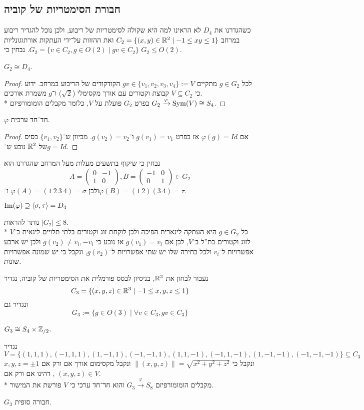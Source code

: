 \subsection{חבורת הסימטריות של קוביה}
כשהגדרנו את $D_4$ לא הראינו למה היא שקולה לסימטריות של ריבוע, ולכן נוכל להגדיר ריבוע במרחב $C_2 = \{ (x, y) \in \mathbb{R}^2 \mid -1 \le xy \le 1 \}$
ואת ההזזות על־ידי העתקות אורתוגונליות $G_2 = \{ v \in C_2, g \in O(2) \mid gv \in C_2 \}$.
נבחין כי $G_2 \le O(2)$.
\begin{proposition}
	$G_2 \cong D_4$.
\end{proposition}
\begin{proof}
	לכל $g \in G_2$ מתקיים $gv \in \{v_1, v_2, v_3, v_4\} := V$ הקודקודים של הריבוע במרחב.
	ידוע כי $V \subseteq C_2$ קבוצת וקטורים עם אורך מקסימלי ($\sqrt{2}$) ו־$g$ משמרת אורכים. \\*
	בפרט $G_2$ פועלת על $V$, כלומר מקבלים הומומורפיזם $G_2 \xrightarrow{\varphi} \operatorname{Sym}(V) \cong S_4$.
\end{proof}
\begin{lemma}
	$\varphi$ חד־חד ערכית.
\end{lemma}
\begin{proof}
	אם $\varphi(g) = Id$ אז בפרט $g(v_1) = v_1$ ו־$g(v_2) = v_2$. מכיוון ש־$\{v_1, v_2\}$ בסיס של $\mathbb{R}^2$ נובע ש־$g = Id$.
\end{proof}
נבחין כי שיקוף בתשעים מעלות מעל המרחב שהגדרנו הוא
\[
	A = \begin{pmatrix}
		0 & -1 \\
		1 & 0
	\end{pmatrix},
	B = \begin{pmatrix}
		-1 & 0 \\
		0 & 1
	\end{pmatrix}
	\in G_2
\]
ולכן $\varphi(A) = (1\ 2\ 3\ 4) = \sigma$ ו־$\varphi(B) = (1\ 2)(3\ 4) = \tau$.
\begin{conclusion}
	$\operatorname{Im}(\varphi) \supseteq \langle \sigma, \tau \rangle = D_4$
\end{conclusion}
נותר להראות $|G_2| \le 8$. \\*
כל $g \in G_2$ היא העתקה לינארית הפיכה ולכן לוקחת זוג וקטורים בלתי תלויים לינאית ב־$V$ לזוג וקטורים בת''ל ב־$V$,
לכן אם $g(v_1) = v_i$ אז נובע כי $g(v_2) \ne v_i, -v_i$ ולכן יש ארבע אפשרויות ל־$v_i$ ולכל בחירה שלו יש שתי אפשרויות ל־$g(v_2)$, ונקבל כי יש שמונה אפשרויות שונות.

נעבור לבחון את $\mathbb{R}^3$, בניסיון לבסס פורמלית את הסימטריות של קוביה, נגדיר
\[
	C_3 = \{ (x, y, z) \in \mathbb{R}^3 \mid -1 \le x, y, z \le 1 \}
\]
ונגדיר גם
\[
	G_3 := \{ g \in O(3) \mid \forall v \in C_3, g v \in C_3 \}
\]
\begin{theorem}
	$G_3 \cong S_4 \times \mathbb{Z}_{/2}$.
\end{theorem}
נגדיר $V = \{ (1, 1, 1), (-1, 1, 1), (1, -1, 1), (-1, -1, 1), (1, 1, -1), (-1, 1, -1), (1, -1, -1), (-1, -1, -1)\} \subseteq C_3$
ונקבל כי $\lVert (x, y, z) \rVert = \sqrt{x^2 + y^2 + z^2}$ ונקבל מקסימום אורך אם ורק אם $x, y, z = \pm 1$, דהינו אם ורק אם $(x, y, z) \in V$. \\*
מקבלים הומומורפיזם $G_3 \xrightarrow{\varphi} S_8$ והוא חד־חד ערכי כי $V$ פורשת את המישור.
\begin{conclusion}
	$G_3$ חבורה סופית.
\end{conclusion}

